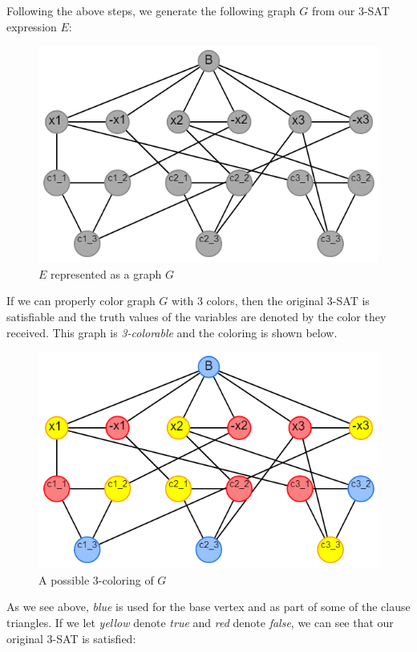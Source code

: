 \documentclass{article}
\theoremstyle{definition}
\begin{document}
Following the above steps, we generate the following graph \(G\) from our 3-SAT expression \(E\):

\begin{figure}[H]
\centering
\includegraphics[scale=0.6]{images/3sat-1.png}
\caption{\(E\) represented as a graph \(G\)}
\end{figure}

If we can properly color graph \(G\) with 3 colors, then the original 3-SAT is satisfiable and the truth values of the variables are denoted by the color they received. This graph is \emph{3-colorable} and the coloring is shown below.

\begin{figure}[H]
\centering
\includegraphics[scale=0.6]{images/3sat-2.png}
\caption{A possible 3-coloring of \(G\)}
\end{figure}

As we see above, \emph{blue} is used for the base vertex and as part of some of the clause triangles. If we let \emph{yellow} denote \emph{true} and \emph{red} denote \emph{false}, we can see that our original 3-SAT is satisfied:
\end{document}
